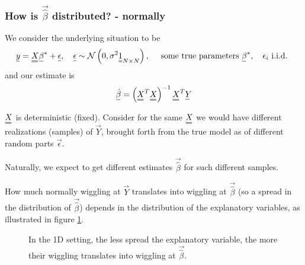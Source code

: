 \subsubsection{How is $\vec{\hat{\beta}}$ distributed? - normally}
We consider the underlying situation to be
\begin{equation}
    \vec{y}=\mat{X} \vec{\beta}^*+\vec{\epsilon}, \quad \vec{\epsilon} \sim \mathcal{N}\left(0, \sigma^2 \mat{1}_{N \times N}\right), \quad \text { some true parameters } \vec{\beta}^{*}, \quad \epsilon_i \text { i.i.d. }
\end{equation}
and our estimate is
\begin{equation}
    \vec{\hat{\beta}}=\left(\mat{X}^T \mat{X}\right)^{-1} \mat{X}^T \vec{Y}
\end{equation}

$\mat{X}$ is deterministic (fixed). Consider for the same $\mat{X}$ we would 
have different realizations (samples) of $\vec{Y}$, brought forth
from the true model as of different random parts $\vec{\epsilon}$.

Naturally, we expect to get different estimates $\vec{\hat{\beta}}$ for such
different samples.




How much normally wiggling at $\vec{Y}$ translates into wiggling at $\vec{\hat{\beta}}$ (so a spread
in the distribution of $\vec{\hat{\beta}}$) depends in the distribution of the explanatory variables,
as illustrated in figure \ref{fig:uncertainty_beta_x}.

\begin{figure}[!htb]
 \centering
 \hfill
 \caption{In the 1D setting, the less spread the explanatory variable, the more their wiggling translates into wiggling at $\vec{\hat{\beta}}$.}
 \label{fig:uncertainty_beta_x}
\end{figure}

